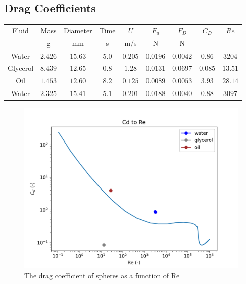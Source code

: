 \documentclass{article}
\begin{document}
\subsection{Drag Coefficients}

\begin{center}
\begin{tabular}{|c|c|c|c|c|c|c|c|c|}
\hline
Fluid & Mass & Diameter & Time & $U$ & $F_u$ & $F_D$ & $C_D$ & $Re$ \\
- & g & mm & s & m/s & N & N & - & - \\
\hline
Water & $2.426$ & $15.63$ & $5.0$ & $0.205$ & $0.0196$ & $0.0042$ & $0.86$ & $3204$ \\
Glycerol & $8.439$ & $12.65$ & $0.8$ & $1.28$ & $0.0131$ & $0.0697$ & $0.085$ & $13.51$ \\
Oil & $1.453$ & $12.60$ & $8.2$ & $0.125$ & $0.0089$ & $0.0053$ & $3.93$ & $28.14$ \\
Water & $2.325$ & $15.41$ & $5.1$ & $0.201$ & $0.0188$ & $0.0040$ & $0.88$ & $3097$ \\
\hline
\end{tabular}
\end{center}

\begin{figure}[H]
\centering
\includegraphics[width=1\textwidth]{CdRe_graph.png}
\caption{\label{fig:CdRe_graph} The drag coefficient of spheres as a function of Re}
\end{figure}
\end{document}
